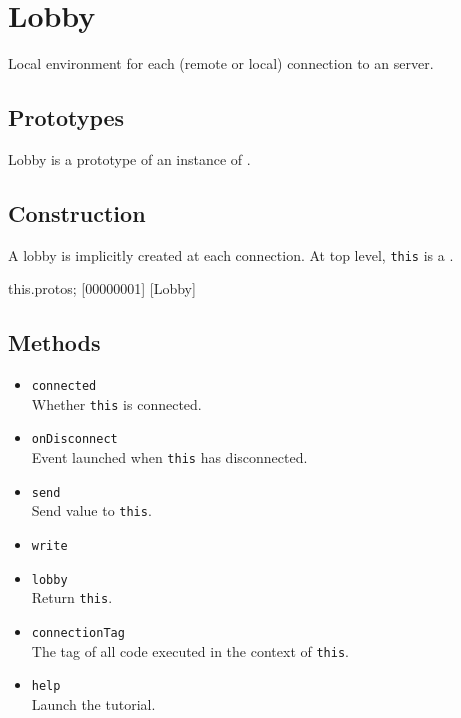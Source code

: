 \section{Lobby}
Local environment for each (remote or local) connection to an \urbi
server.

\subsection{Prototypes}

Lobby is a prototype of an instance of .

\subsection{Construction}

A lobby is implicitly created at each connection. At top level,
\lstinline|this| is a .

\begin{urbiscript}
this.protos;
[00000001] [Lobby]
\end{urbiscript}

\subsection{Methods}
\begin{itemize}
\item \lstinline|connected|\\
  Whether \lstinline|this| is connected.

\item \lstinline|onDisconnect|\\
  Event launched when \lstinline|this| has disconnected.

\item \lstinline|send|\\
  Send value to \lstinline|this|.

\item \lstinline|write|\\

\item \lstinline|lobby|\\
  Return \lstinline|this|.

\item \lstinline|connectionTag|\\
  The tag of all code executed in the context of \lstinline|this|.

\item \lstinline|help|\\
  Launch the tutorial.

\end{itemize}

